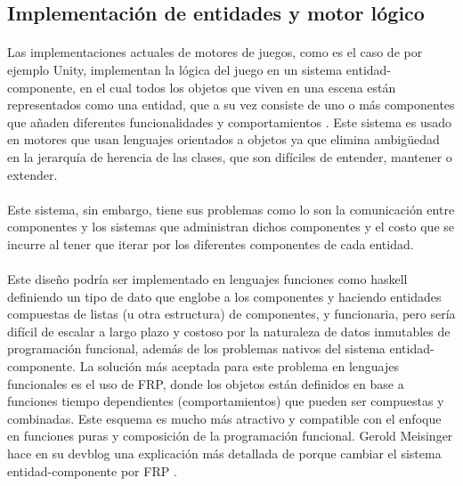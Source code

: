 \documentclass{standalone}
\begin{document}
\subsection{Implementación de entidades y motor lógico}

\paragraph{}
Las implementaciones actuales de motores de juegos, como es el caso de por ejemplo Unity, implementan la lógica del juego en un sistema entidad-componente, en el cual todos los objetos que viven en una escena están representados como una entidad, que a su vez consiste de uno o más componentes que añaden diferentes funcionalidades y comportamientos \cite{JasonGregory-GameEngineArchitecture}. Este sistema es usado en motores que usan lenguajes orientados a objetos ya que elimina ambigüedad en la jerarquía de herencia de las clases, que son difíciles de entender, mantener o extender.

\paragraph{}
Este sistema, sin embargo, tiene sus problemas como lo son la comunicación entre componentes y los sistemas que administran dichos componentes y el costo que se incurre al tener que iterar por los diferentes componentes de cada entidad.

\paragraph{}
Este diseño podría ser implementado en lenguajes funciones como haskell definiendo un tipo de dato que englobe a los componentes y haciendo entidades compuestas de listas (u otra estructura) de componentes, y funcionaria, pero sería difícil de escalar a largo plazo y costoso por la naturaleza de datos inmutables de programación funcional, además de los problemas nativos del sistema entidad-componente. La solución más aceptada para este problema en lenguajes funcionales es el uso de FRP, donde los objetos están definidos en base a funciones tiempo dependientes (comportamientos) que pueden ser compuestas y combinadas. Este esquema es mucho más atractivo y compatible con el enfoque en funciones puras y composición de la programación funcional. Gerold Meisinger hace en su devblog una explicación más detallada de porque cambiar el sistema entidad-componente por FRP \cite{devblog:Meisinger}.
\end{document}
